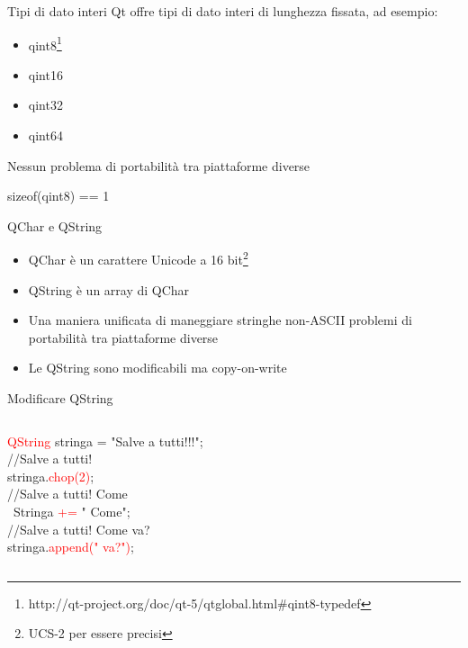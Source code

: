 \documentclass{beamer}
\begin{document}
\begin{frame}{Tipi di dato interi}
	Qt offre tipi di dato interi di lunghezza fissata, ad esempio:
	\begin{itemize}
		\item qint8\footnote{http://qt-project.org/doc/qt-5/qtglobal.html\#qint8-typedef}
		\item qint16
		\item qint32
		\item qint64
	\end{itemize}
	Nessun problema di portabilità tra piattaforme diverse
	\begin{block}{}
		\centering
		{\ttfamily sizeof(qint8) == 1}
	\end{block}
\end{frame}

\begin{frame}{QChar e QString}
	\begin{itemize}
		\item QChar è un carattere Unicode a 16 bit\footnote{UCS-2 per essere precisi}
		\item QString è un array di QChar
		\item Una maniera unificata di maneggiare stringhe non-ASCII
		problemi di portabilità tra piattaforme diverse
		\item Le QString sono modificabili ma copy-on-write
	\end{itemize}	
\end{frame}

\begin{frame}{Modificare QString}
	\begin{columns}
		\begin{block}{}
			{\ttfamily \textcolor{red}{QString} stringa = "Salve a tutti!!!";\\
				\bigskip
				//Salve a tutti!\\
				stringa.\textcolor{red}{chop(2)};\\
				\bigskip
				//Salve a tutti! Come\\\
				Stringa \textcolor{red}{+=} " Come";\\
				\bigskip
				//Salve a tutti! Come va?\\
				stringa.\textcolor{red}{append(" va?")};}
		\end{block}
	\end{columns}
\end{frame}
\end{document}
